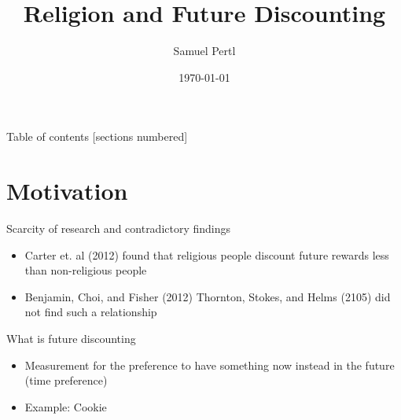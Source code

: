 \documentclass[10pt]{beamer}
\title{Religion and Future Discounting}
\date{\today}
\author{Samuel Pertl}
\institute{Quest University}
\begin{document}
\maketitle
\begin{frame}{Table of contents}
[sections numbered]
\tableofcontents[hideallsubsections]
\end{frame}

\section{Motivation}
\begin{frame}[fragile] {Scarcity of research and contradictory findings} 
\begin{itemize}
\item Carter et. al (2012) found that religious people discount future rewards less than non-religious people  
\\  
\item Benjamin, Choi, and Fisher (2012) Thornton, Stokes, and Helms (2105) did not find such a relationship 
\end{itemize}
\end{frame}


\begin{frame}[fragile] {What is future discounting} 
\begin{itemize}
\item Measurement for the preference to have something now instead in the future (time preference) 
\item Example: Cookie
\end{itemize}
\end{frame}
\end{document}
